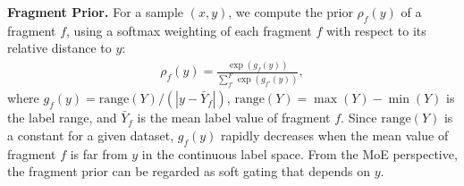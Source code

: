 \documentclass{article}
\theoremstyle{plain}
\theoremstyle{definition}
\theoremstyle{remark}
\begin{document}
\textbf{Fragment Prior.}
For a sample $(x, y)$, we compute the prior $\rho_f(y)$ of a fragment $f$,
using a softmax weighting of each fragment $f$ with respect to its relative distance to $y$:
\begin{align}\label{eq:np}
    \rho_f(y)=\frac{\exp(g_f(y))}{\sum_{f'}^F \exp(g_{f'}(y))}, %
\end{align}
where $g_f(y)=\text{range}(Y)/ (|y - \bar{Y}_f|)$, $\text{range}(Y)=\max(Y) - \min(Y)$ is the label range, and $\bar{Y}_f$ is the mean label value of fragment $f$.
Since $\text{range}(Y)$ is a constant for a given dataset, $g_f(y)$ rapidly decreases when the mean value of fragment $f$ is far from $y$ in the continuous label space.
From the MoE perspective, the fragment prior can be regarded as soft gating that depends on $y$.
\end{document}
